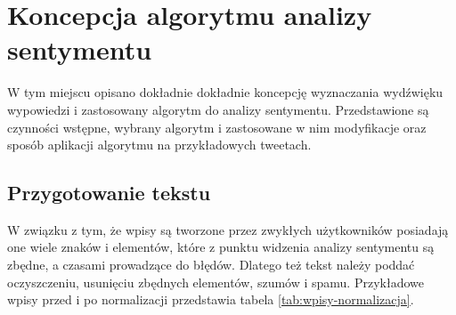 \section{Koncepcja algorytmu analizy sentymentu}
\label{section:koncepcjaialgorytmanalizysentymentu}

W tym miejscu opisano dokładnie dokładnie koncepcję wyznaczania wydźwięku
wypowiedzi i zastosowany algorytm do analizy sentymentu. Przedstawione są
czynności wstępne, wybrany algorytm i zastosowane w nim modyfikacje oraz
sposób aplikacji algorytmu na przykładowych tweetach.

\subsection{Przygotowanie tekstu}
\label{subsection:normalizacjatekstu}

W związku z tym, że wpisy są tworzone przez zwykłych użytkowników posiadają one
wiele znaków i elementów, które z punktu widzenia analizy sentymentu są zbędne,
a czasami prowadzące do błędów. Dlatego też tekst należy poddać oczyszczeniu,
usunięciu zbędnych elementów, szumów i spamu. Przykładowe wpisy przed i po
normalizacji przedstawia tabela \ref{tab:wpisy-normalizacja}.


